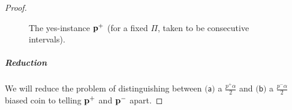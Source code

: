 \begin{proof}
\begin{figure}[!ht]
\caption{\label{fig:construction:lb:tolerant:uniformity:D:pm}The \textsf{yes}-instance $\mathbf{p}^+$ (for a fixed $\Pi$, taken to be consecutive intervals).}
\end{figure}
  
  \subparagraph{Reduction} We will reduce the problem of distinguishing between $\textsf{(a)}$ a $\frac{p^+\alpha}{2}$ and $\textsf{(b)}$ a $\frac{p^-\alpha}{2}$ biased coin to telling $\mathbf{p}^+$ and $\mathbf{p}^-$ apart.
  

\end{proof}
